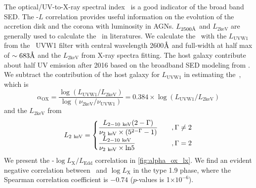 The optical/UV-to-X-ray spectral index \alphaox\, is a good indicator of the broad band SED. The \alphaox-$L$ correlation provides useful information on the evolution of the accretion disk and the corona with luminosity in AGNs. $L_\mathrm{2500 \text{\normalfont\AA}}$ and $L_\mathrm{2keV}$ are generally used to calculate the \alphaox\, in literatures. We calculate the \alphaox\ with the $L_\mathrm{UVW1}$ from the \uvot\, UVW1 filter with central wavelength {2600{$\text{\normalfont\AA}$}} and full-width at half max of $\sim 683\text{\normalfont\AA}$ \citep{2008MNRAS.383..627P} and the $L_\mathrm{2keV}$ from X-ray spectra fitting. The host galaxy contribute about half UV emission after 2016 based on the broadband SED modeling from \citet{2018MNRAS.480.3898N}. We subtract the contribution of the host galaxy for $L_\mathrm{UVW1}$ in estimating the \alphaox\,, which is
\begin{equation}
\alpha_\mathrm{OX} = \frac{\log (L_\mathrm{UVW1} / L_\mathrm{2keV} )} {\log (\nu_\mathrm{2keV} /  \nu_\mathrm{UVW1} )}=0.384\times {\log (L_\mathrm{UVW1} / L_\mathrm{2keV} )}
\label{definition_alpha_ox}
\end{equation}
and the $L_\mathrm{2keV}$ from
\begin{eqnarray}
\large{
L_\mathrm{2~keV}= 
\begin{cases}\displaystyle\frac{L_\mathrm{2-10~ keV} (2-\Gamma)}{\nu_\mathrm{2~keV} \times (5^{2-\Gamma}-1)} \quad &, 
\Gamma \neq 2 \\ 
\displaystyle\frac{L_\mathrm{2-10~ keV}}{\nu_\mathrm{2~keV} \times \mathrm{ln} 5}\quad  &, \Gamma = 2
\end{cases} }
\label{definition_f2eV}
\end{eqnarray} 
 We present the \alphaox-$\log{L_\mathrm{X}/L_\mathrm{Edd}}$ correlation in \autoref{fig:alpha_ox_lx}.  We find an evident negative correlation between \alphaox\, and $\log{L_\mathrm{X}}$ in the type 1.9 phase, where the Spearman correlation coefficient is $-0.74$ ($p$-values is 1$\times10^{-6}$).
 



